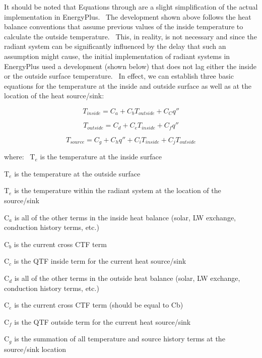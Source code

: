It should be noted that Equations through are a slight simplification of the actual implementation in EnergyPlus.~ The development shown above follows the heat balance conventions that assume previous values of the inside temperature to calculate the outside temperature.~ This, in reality, is not necessary and since the radiant system can be significantly influenced by the delay that such an assumption might cause, the initial implementation of radiant systems in EnergyPlus used a development (shown below) that does not lag either the inside or the outside surface temperature.~ In effect, we can establish three basic equations for the temperature at the inside and outside surface as well as at the location of the heat source/sink:

\begin{equation}
{T_{inside}} = {C_a} + {C_b}{T_{outside}} + {C_C}q''
\end{equation}

\begin{equation}
{T_{outside}} = {C_d} + {C_e}{T_{inside}} + {C_f}q''
\end{equation}

\begin{equation}
{T_{source}} = {C_g} + {C_h}q'' + {C_i}{T_{inside}} + {C_j}{T_{outside}}
\end{equation}

where:~ T\(_{e}\) is the temperature at the inside surface

T\(_{e}\) is the temperature at the outside surface

T\(_{e}\) is the temperature within the radiant system at the location of the source/sink

C\(_{a}\) is all of the other terms in the inside heat balance (solar, LW exchange, conduction history terms, etc.)

C\(_{b}\) is the current cross CTF term

C\(_{c}\) is the QTF inside term for the current heat source/sink

C\(_{d}\) is all of the other terms in the outside heat balance (solar, LW exchange, conduction history terms, etc.)

C\(_{e}\) is the current cross CTF term (should be equal to Cb)

C\(_{f}\) is the QTF outside term for the current heat source/sink

C\(_{g}\) is the summation of all temperature and source history terms at the source/sink location

